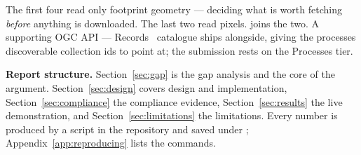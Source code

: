 The first four read only footprint geometry --- deciding what is worth fetching
\emph{before} anything is downloaded. The last two read pixels.
 joins the two. A supporting OGC API ---
Records~\cite{ogcrecords} catalogue ships alongside, giving the processes
discoverable collection ids to point at; the submission rests on the Processes
tier.

\textbf{Report structure.} Section~\ref{sec:gap} is the gap analysis and the
core of the argument. Section~\ref{sec:design} covers design and
implementation, Section~\ref{sec:compliance} the compliance evidence,
Section~\ref{sec:results} the live demonstration, and
Section~\ref{sec:limitations} the limitations. Every number is produced by a
script in the repository and saved under ;
Appendix~\ref{app:reproducing} lists the commands.
